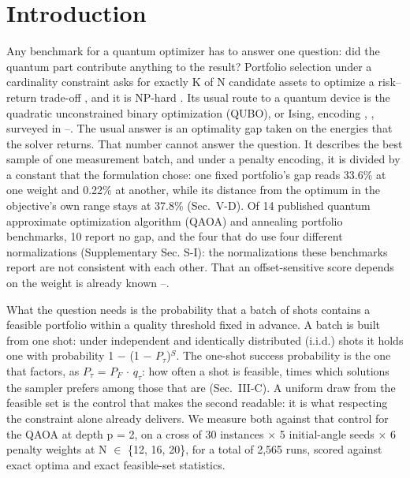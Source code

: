 \documentclass[journal]{IEEEtran}
\begin{document}
\section{Introduction}


Any benchmark for a quantum optimizer has to answer one question: did the quantum part contribute anything to the result? Portfolio selection under a cardinality constraint asks for exactly K of N candidate assets to optimize a risk--return trade-off \cite{ref1}, and it is NP-hard \cite{ref2}. Its usual route to a quantum device is the quadratic unconstrained binary optimization (QUBO), or Ising, encoding \cite{ref3}, \cite{ref4}, surveyed in \cite{ref5}--\cite{ref7}. The usual answer is an optimality gap taken on the energies that the solver returns. That number cannot answer the question. It describes the best sample of one measurement batch, and under a penalty encoding, it is divided by a constant that the formulation chose: one fixed portfolio's gap reads 33.6\% at one weight and 0.22\% at another, while its distance from the optimum in the objective's own range stays at 37.8\% (Sec.~V-D). Of 14 published quantum approximate optimization algorithm (QAOA) and annealing portfolio benchmarks, 10 report no gap, and the four that do use four different normalizations (Supplementary Sec. S-I): the normalizations these benchmarks report are not consistent with each other. That an offset-sensitive score depends on the weight is already known \cite{ref8}--\cite{ref10}.


What the question needs is the probability that a batch of shots contains a feasible portfolio within a quality threshold fixed in advance. A batch is built from one shot: under independent and identically distributed (i.i.d.) shots it holds one with probability 1 $-$ (1 $-$ $P_{\tau}$)$^{S}$. The one-shot success probability is the one that factors, as $P_{\tau}$ = $P_{F}$ $\cdot$ $q_{\tau}$: how often a shot is feasible, times which solutions the sampler prefers among those that are (Sec.~III-C). A uniform draw from the feasible set is the control that makes the second readable: it is what respecting the constraint alone already delivers. We measure both against that control for the QAOA at depth p = 2, on a cross of 30 instances $\times$ 5 initial-angle seeds $\times$ 6 penalty weights at N $\in$ \{12, 16, 20\}, for a total of 2,565 runs, scored against exact optima and exact feasible-set statistics.
\end{document}

